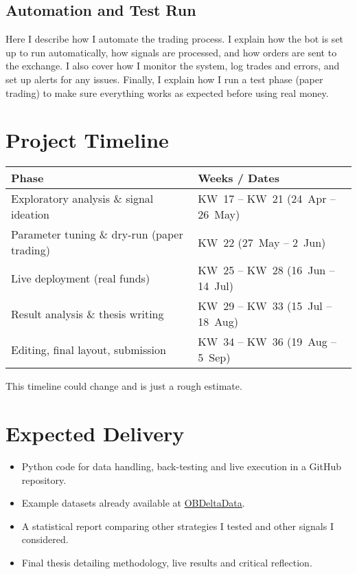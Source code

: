 \documentclass[12pt,a4paper]{article}
\begin{document}
\subsection{Automation and Test Run}
Here I describe how I automate the trading process. I explain how the bot
is set up to run automatically, how signals are processed, and how orders
are sent to the exchange. I also cover how I monitor the system, log trades
and errors, and set up alerts for any issues. Finally, I explain how I run a
test phase (paper trading) to make sure everything works as expected before
using real money.

\section{Project Timeline}
\begin{center}
\begin{tabular}{|>{\raggedright\arraybackslash}p{7cm}|>{\raggedright\arraybackslash}p{7cm}|}
\hline
\textbf{Phase} & \textbf{Weeks / Dates}\\ \hline
Exploratory analysis \& signal ideation & KW~17 – KW~21 (24~Apr – 26~May)\\ \hline
Parameter tuning \& dry-run (paper trading) & KW~22 (27~May – 2~Jun)\\ \hline
Live deployment (real funds) & KW~25 – KW~28 (16~Jun – 14~Jul)\\ \hline
Result analysis \& thesis writing & KW~29 – KW~33 (15~Jul – 18~Aug)\\ \hline
Editing, final layout, submission & KW~34 – KW~36 (19~Aug – 5~Sep)\\ \hline
\end{tabular}
\end{center}

\smallskip
This timeline could change and is just a rough estimate.

\section{Expected Delivery}
\begin{itemize}
  \item Python code for data handling, back-testing and live execution in a GitHub repository.
  \item Example datasets already available at
        \href{https://github.com/AJslashTracey/OBDeltaData}{OBDeltaData}.
  \item A statistical report comparing other strategies I tested and other signals I considered.
  \item Final thesis detailing methodology, live results and critical reflection.
\end{itemize}
\end{document}
